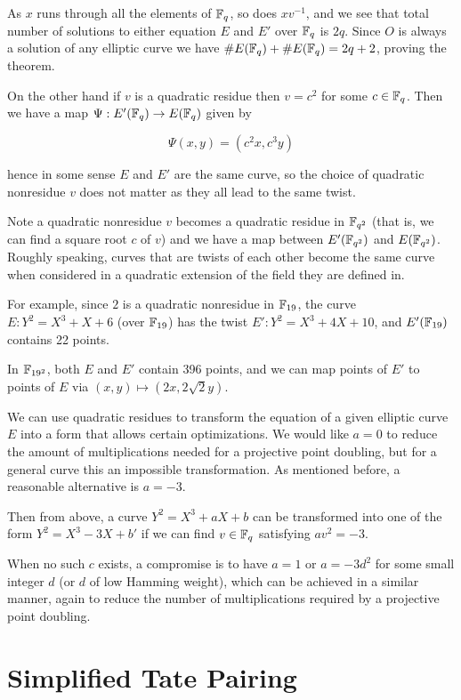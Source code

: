 As $x$ runs through all the elements of $\mathbb{F}_q$, so does $xv^{-1}$,
and we see that total number of solutions to either equation $E$ and $E'$
over $\mathbb{F}_q$ is $2q$.
Since $O$ is always a solution of any elliptic curve we have
$\#E(\mathbb{F}_q) + \#E(\mathbb{F}_q) = 2q + 2$, proving the theorem.

On the other hand if $v$ is a quadratic residue then $v = c^2$ for some
$c \in \mathbb{F}_q$. Then we have a map $\Psi : E'(\mathbb{F}_q) \rightarrow E(\mathbb{F}_q)$
given by

\[ \Psi(x,y) = (c^2 x,c^3 y) \]

hence in some sense $E$ and $E'$ are the same curve, so the choice of
quadratic nonresidue $v$ does not matter as they all lead to the same twist.

Note a quadratic
nonresidue $v$ becomes a quadratic residue in $\mathbb{F}_{q^2}$ (that is, we
can find a square root $c$ of $v$)
and we have a map between
$E'(\mathbb{F}_{q^2})$ and $E(\mathbb{F}_{q^2})$. Roughly speaking, curves that are twists
of each other become the same curve when considered in a quadratic extension
of the field they are defined in.

For example, since $2$ is a quadratic nonresidue in $\mathbb{F}_{19}$,
the curve $E : Y^2 = X^3 + X + 6$ (over $\mathbb{F}_{19}$) has the
twist $E': Y^2 = X^3 + 4 X + 10$, and $E'(\mathbb{F}_{19})$ contains 22 points.

In $\mathbb{F}_{19^2}$, both $E$ and $E'$ contain 396 points, and we can map
points of $E'$ to points of $E$ via $(x,y) \mapsto (2 x, 2\sqrt{2} y)$.

We can use quadratic residues to transform the equation of a given elliptic
curve $E$ into a form that allows certain optimizations.
We would like $a = 0$ to reduce the amount of multiplications
needed for a projective point doubling, but for a general curve
this an impossible transformation. As mentioned before, a
reasonable alternative is $a = -3$.

Then from above, a curve $Y^2 = X^3 + aX + b$ can be transformed into
one of the form $Y^2 = X^3 - 3X + b'$ if we can find $v\in \mathbb{F}_q$
satisfying $a v^2 = -3$.

When no such $c$ exists, a compromise is to have
$a = 1$ or $a = -3 d^2$ for some small integer $d$
(or $d$ of low Hamming weight), which can be achieved in a similar manner,
again to reduce the number of multiplications required by a projective point
doubling.

\section {Simplified Tate Pairing}

